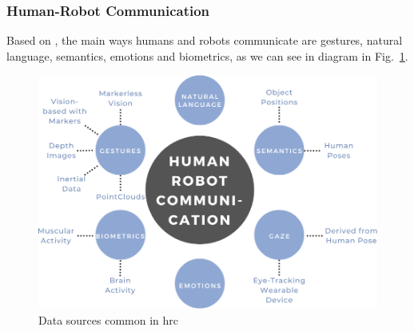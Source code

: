 \subsubsection{Human-Robot Communication}

Based on \cite{Mukherjee2022,Semeraro2023,Castro2021}, the main ways humans and robots communicate are gestures, natural language, semantics, emotions and biometrics, as we can see in diagram in Fig.~\ref{interaction}.

\begin{figure}
\centerline{\includegraphics[width=5in]{figs/interaction.PNG}}
\caption{Data sources common in \acl{hrc}}
\label{interaction}
\end{figure}

